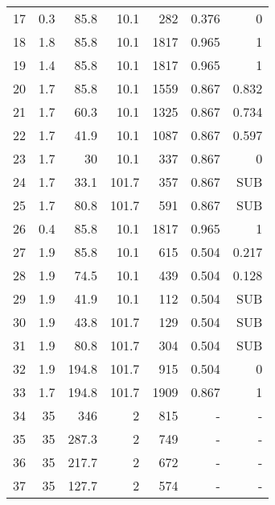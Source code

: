 \documentclass[review,3p]{elsarticle}
\begin{document}
\begin{table}[H]
\begin{tabular}{rrrrrrr}
17 & 0.3 & 85.8 & 10.1 & 282 & 0.376 &  0 \\

18 & 1.8 & 85.8 & 10.1 & 1817 & 0.965 &  1 \\

19 & 1.4 & 85.8 & 10.1 & 1817 & 0.965 &  1 \\

20 & 1.7 & 85.8 & 10.1 & 1559 & 0.867 & 0.832 \\

21 & 1.7 & 60.3 & 10.1 & 1325 & 0.867 & 0.734 \\

22 & 1.7 & 41.9 & 10.1 & 1087 & 0.867 & 0.597 \\

23 & 1.7 & 30 & 10.1 & 337 & 0.867 &  0 \\

24 & 1.7 & 33.1 & 101.7 & 357 & 0.867 & SUB \\

25 & 1.7 & 80.8 & 101.7 & 591 & 0.867 & SUB \\

26 & 0.4 & 85.8 & 10.1 & 1817 & 0.965 &  1 \\

27 & 1.9 & 85.8 & 10.1 & 615 & 0.504 & 0.217 \\

28 & 1.9 & 74.5 & 10.1 & 439 & 0.504 & 0.128 \\

29 & 1.9 & 41.9 & 10.1 & 112 & 0.504 & SUB \\

30 & 1.9 & 43.8 & 101.7 & 129 & 0.504 & SUB \\

31 & 1.9 & 80.8 & 101.7 & 304 & 0.504 & SUB \\

32 & 1.9 & 194.8 & 101.7 & 915 & 0.504 &  0 \\

33 & 1.7 & 194.8 & 101.7 & 1909 & 0.867 &  1 \\

34 & 35 & 346 &  2 & 815 &  - &  - \\

35 & 35 & 287.3 &  2 & 749 &  - &  - \\

36 & 35 & 217.7 &  2 & 672 &  - &  - \\

37 & 35 & 127.7 &  2 & 574 &  - &  - \\
\bottomrule
\end{tabular}  


\label{tab:statePointsSCRH}
\end{table}
\end{document}
